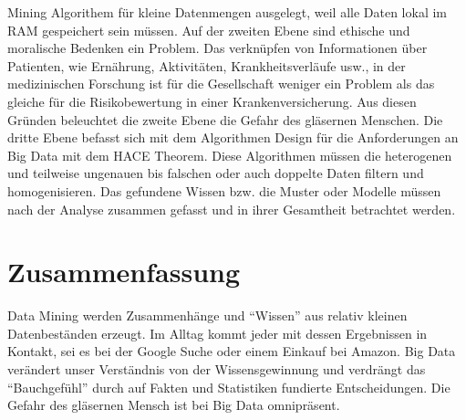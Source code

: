 \documentclass[12pt,journal,compsoc,ngerman]{IEEEtran}
\begin{document}
Mining Algorithem für kleine Datenmengen ausgelegt, weil alle Daten lokal im RAM gespeichert sein müssen.  
Auf der zweiten Ebene sind ethische und moralische Bedenken ein Problem. Das verknüpfen von Informationen über Patienten, wie Ernährung,
Aktivitäten, Krankheitsverläufe usw., in der medizinischen 
Forschung ist für die Gesellschaft weniger ein Problem als das gleiche für die Risikobewertung in einer Krankenversicherung.  Aus diesen 
Gründen beleuchtet die zweite Ebene die Gefahr des gläsernen Menschen. Die dritte Ebene befasst sich mit dem Algorithmen Design für die 
Anforderungen an Big Data mit dem HACE Theorem. Diese Algorithmen müssen die heterogenen und teilweise ungenauen bis falschen oder auch 
doppelte Daten filtern und homogenisieren. Das gefundene Wissen bzw. die Muster oder Modelle müssen nach der Analyse zusammen gefasst und in ihrer 
Gesamtheit betrachtet werden. 
\section{Zusammenfassung}
 Data Mining werden Zusammenhänge und \enquote{Wissen} aus relativ kleinen Datenbeständen erzeugt. Im Alltag kommt jeder 
mit dessen Ergebnissen in Kontakt, sei es bei der Google Suche oder einem Einkauf bei Amazon. Big Data verändert unser Verständnis von der 
Wissensgewinnung und verdrängt das \enquote{Bauchgefühl} durch auf Fakten und Statistiken fundierte Entscheidungen. Die Gefahr des gläsernen Mensch ist bei Big Data omnipräsent.




%
%
\end{document}
